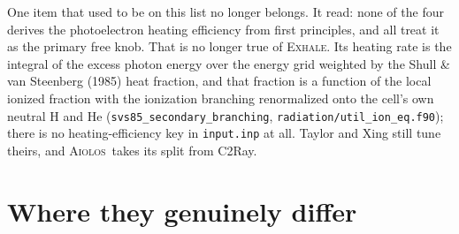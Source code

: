 \documentclass[english,a4paper]{my_memo}
\newcommand{\EXHALE}{\textsc{Exhale}}
\newcommand{\AIOLOS}{\textsc{Aiolos}}
\begin{document}
One item that used to be on this list no longer belongs. It read: none of the
four derives the photoelectron heating efficiency from first principles, and
all treat it as the primary free knob. That is no longer true of \EXHALE. Its
heating rate is the integral of the excess photon energy over the energy grid
weighted by the Shull \& van Steenberg (1985) heat fraction, and that fraction
is a function of the local ionized fraction with the ionization branching
renormalized onto the cell's own neutral H and He
(\texttt{svs85\_secondary\_branching}, \texttt{radiation/util\_ion\_eq.f90});
there is no heating-efficiency key in \texttt{input.inp} at all. Taylor and
Xing still tune theirs, and \AIOLOS\ takes its split from C2Ray.

\section{Where they genuinely differ}
\end{document}
